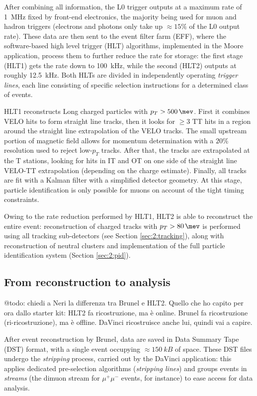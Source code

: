 After combining all information, the L0 trigger outputs at a maximum rate of \SI{1}{\mega\hertz} fixed by front-end electronics, the majority being used for muon and hadron triggers (electrons and photons only take up $\approx 15\%$ of the L0 output rate).
These data are then sent to the event filter farm (EFF), where the software-based high level trigger (HLT) algorithms, implemented in the Moore application, process them to further reduce the rate for storage:
the first stage (HLT1) gets the rate down to \SI{100}{\kilo\hertz}, while the second (HLT2) outputs at roughly \SI{12.5}{\kilo\hertz}.
Both HLTs are divided in independently operating \textit{trigger lines}, each line consisting of specific selection instructions for a determined class of events.

HLT1 reconstructs Long charged particles with $p_T > \SI{500}{\mev}$. First it combines VELO hits to form straight line tracks, then it looks for $\geq 3$ TT hits in a region around the straight line extrapolation of the VELO tracks. The small upstream portion of magnetic field allows for momentum determination with a $20\%$ resolution used to reject low-$p_T$ tracks.
After that, the tracks are extrapolated at the T stations, looking for hits in IT and OT on one side of the straight line VELO-TT extrapolation (depending on the charge estimate).
Finally, all tracks are fit with a Kalman filter with a simplified detector geometry.
At this stage, particle identification is only possible for muons on account of the tight timing constraints.

Owing to the rate reduction performed by HLT1, HLT2 is able to reconstruct the entire event:
reconstruction of charged tracks with $p_T > \SI{80}{\mev}$ is performed using all tracking sub-detectors (see Section \ref{sec:2:tracking}), along with reconstruction of neutral clusters and implementation of the full particle identification system (Section \ref{sec:2:pid}).

\subsection{From reconstruction to analysis}
@todo: chiedi a Neri la differenza tra Brunel e HLT2. Quello che ho capito per ora dallo starter kit: HLT2 fa ricostruzione, ma è online. Brunel fa ricostruzione (ri-ricostruzione), ma è offline. DaVinci ricostruisce anche lui, quindi vai a capire.

After event reconstruction by Brunel, data are saved in Data Summary Tape (DST) format, with a single event occupying $\approx \SI{150}{kB}$ of space.
These DST files undergo the \textit{stripping} process, carried out by the DaVinci application: this applies dedicated pre-selection algorithms (\textit{stripping lines}) and groups events in \textit{streams} (the dimuon stream for $\mu^+\mu^-$ events, for instance) to ease access for data analysis.

